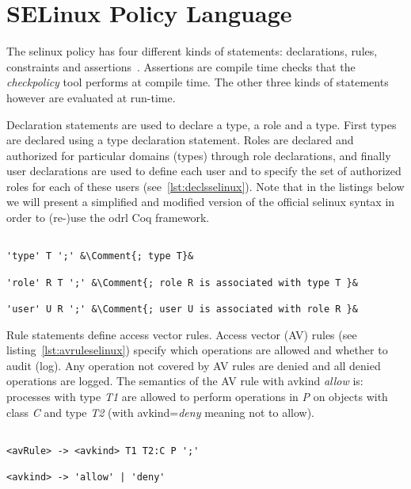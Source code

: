 \section{SELinux Policy Language}

The \ac{selinux} policy has four different kinds of statements: declarations, rules, constraints and assertions~\cite{ArcherLP03}. Assertions are compile time checks that the \emph{checkpolicy} tool performs at compile time. The other three kinds of statements however are evaluated at run-time. 

Declaration statements are used to declare a type, a role and a type. First types are declared using a type declaration statement. Roles are declared and authorized for particular domains (types) through role declarations, and finally user declarations are used to define each user and to specify the set of authorized roles for each of these users (see~\ref{lst:declsselinux}). Note that in the listings below we will present a simplified and modified version of the official \ac{selinux} syntax in order to (re-)use the \ac{odrl} Coq framework.

\lstset{language=selinux}
\begin{lstlisting}[frame=single, caption={Declarations},label={lst:declsselinux}]

'type' T ';' &\Comment{; type T}&

'role' R T ';' &\Comment{; role R is associated with type T }&

'user' U R ';' &\Comment{; user U is associated with role R }&

\end{lstlisting}

Rule statements define access vector rules. Access vector (AV) rules (see listing~\ref{lst:avruleselinux}) specify which operations are allowed and whether to audit (log). Any operation not covered by AV rules are denied and all denied operations are logged. The semantics of the AV rule with avkind \emph{allow} is: processes with type \emph{T1} are allowed to perform operations in \emph{P} on objects with class \emph{C} and type \emph{T2} (with avkind=\emph{deny} meaning not to allow). 

\lstset{language=selinux}
\begin{lstlisting}[frame=single, caption={AV Rule},label={lst:avruleselinux}]

<avRule> -> <avkind> T1 T2:C P ';'

<avkind> -> 'allow' | 'deny'
\end{lstlisting}

